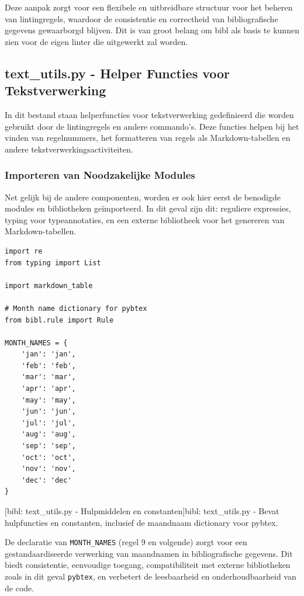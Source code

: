 Deze aanpak zorgt voor een flexibele en uitbreidbare structuur voor het beheren van lintingregels, waardoor de consistentie en correctheid van bibliografische gegevens gewaarborgd blijven. Dit is van groot belang om bibl als basis te kunnen zien voor de eigen linter die uitgewerkt zal worden.

\subsection{text\_utils.py - Helper Functies voor Tekstverwerking}

In dit bestand staan helperfuncties voor tekstverwerking gedefinieerd die worden gebruikt door de lintingregels en andere commando's. Deze functies helpen bij het vinden van regelnummers, het formatteren van regels als Markdown-tabellen en andere tekstverwerkingsactiviteiten.

\subsubsection{Importeren van Noodzakelijke Modules}

Net gelijk bij de andere componenten, worden er ook hier eerst de benodigde modules en bibliotheken geïmporteerd. In dit geval zijn dit: reguliere expressies, typing voor typeannotaties, en een externe bibliotheek voor het genereren van Markdown-tabellen.

\begin{verbatim}
import re
from typing import List

import markdown_table

# Month name dictionary for pybtex
from bibl.rule import Rule

MONTH_NAMES = {
    'jan': 'jan',
    'feb': 'feb',
    'mar': 'mar',
    'apr': 'apr',
    'may': 'may',
    'jun': 'jun',
    'jul': 'jul',
    'aug': 'aug',
    'sep': 'sep',
    'oct': 'oct',
    'nov': 'nov',
    'dec': 'dec'
}
\end{verbatim}
[bibl: text\_utils.py - Hulpmiddelen en constanten]{bibl: text\_utils.py - Bevat hulpfuncties en constanten, inclusief de maandnaam dictionary voor pybtex. \label{lst:bibl_utils_constants}}

De declaratie van \texttt{MONTH\_NAMES} (regel 9 en volgende) zorgt voor een gestandaardiseerde verwerking van maandnamen in bibliografische gegevens. Dit biedt consistentie, eenvoudige toegang, compatibiliteit met externe bibliotheken zoals in dit geval \texttt{pybtex}, en verbetert de leesbaarheid en onderhoudbaarheid van de code.

